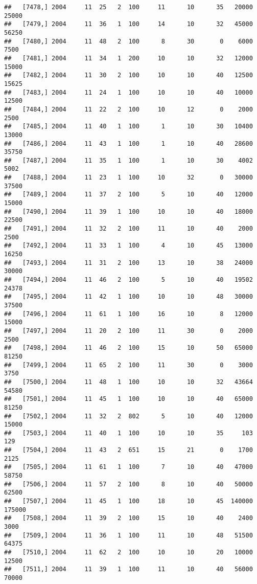 \documentclass{article}\usepackage[]{graphicx}\usepackage[]{color}
\makeatletter
\newenvironment{kframe}{%
 \def\at@end@of@kframe{}%
 \ifinner\ifhmode%
  \def\at@end@of@kframe{\end{minipage}}%
  \begin{minipage}{\columnwidth}%
 \fi\fi%
 \def\FrameCommand##1{\hskip\@totalleftmargin \hskip-\fboxsep
 \colorbox{shadecolor}{##1}\hskip-\fboxsep
     \hskip-\linewidth \hskip-\@totalleftmargin \hskip\columnwidth}%
 \MakeFramed {\advance\hsize-\width
   \@totalleftmargin\z@ \linewidth\hsize
   \@setminipage}}%
 {\par\unskip\endMakeFramed%
 \at@end@of@kframe}
\newenvironment{knitrout}{}{} %
\makeatother
\begin{document}
\begin{knitrout}
\begin{kframe}
\begin{verbatim}
##   [7478,] 2004     11  25   2  100     11      10      35   20000   25000
##   [7479,] 2004     11  36   1  100     14      10      32   45000   56250
##   [7480,] 2004     11  48   2  100      8      30       0    6000    7500
##   [7481,] 2004     11  34   1  200     10      10      32   12000   15000
##   [7482,] 2004     11  30   2  100     10      10      40   12500   15625
##   [7483,] 2004     11  24   1  100     10      10      40   10000   12500
##   [7484,] 2004     11  22   2  100     10      12       0    2000    2500
##   [7485,] 2004     11  40   1  100      1      10      30   10400   13000
##   [7486,] 2004     11  43   1  100      1      10      40   28600   35750
##   [7487,] 2004     11  35   1  100      1      10      30    4002    5002
##   [7488,] 2004     11  23   1  100     10      32       0   30000   37500
##   [7489,] 2004     11  37   2  100      5      10      40   12000   15000
##   [7490,] 2004     11  39   1  100     10      10      40   18000   22500
##   [7491,] 2004     11  32   2  100     11      10      40    2000    2500
##   [7492,] 2004     11  33   1  100      4      10      45   13000   16250
##   [7493,] 2004     11  31   2  100     13      10      38   24000   30000
##   [7494,] 2004     11  46   2  100      5      10      40   19502   24378
##   [7495,] 2004     11  42   1  100     10      10      48   30000   37500
##   [7496,] 2004     11  61   1  100     16      10       8   12000   15000
##   [7497,] 2004     11  20   2  100     11      30       0    2000    2500
##   [7498,] 2004     11  46   2  100     15      10      50   65000   81250
##   [7499,] 2004     11  65   2  100     11      30       0    3000    3750
##   [7500,] 2004     11  48   1  100     10      10      32   43664   54580
##   [7501,] 2004     11  45   1  100     10      10      40   65000   81250
##   [7502,] 2004     11  32   2  802      5      10      40   12000   15000
##   [7503,] 2004     11  40   1  100     10      10      35     103     129
##   [7504,] 2004     11  43   2  651     15      21       0    1700    2125
##   [7505,] 2004     11  61   1  100      7      10      40   47000   58750
##   [7506,] 2004     11  57   2  100      8      10      40   50000   62500
##   [7507,] 2004     11  45   1  100     18      10      45  140000  175000
##   [7508,] 2004     11  39   2  100     15      10      40    2400    3000
##   [7509,] 2004     11  36   1  100     11      10      48   51500   64375
##   [7510,] 2004     11  62   2  100     10      10      20   10000   12500
##   [7511,] 2004     11  39   1  100     11      10      40   56000   70000

\end{verbatim}
\end{kframe}
\end{knitrout}
\end{document}
